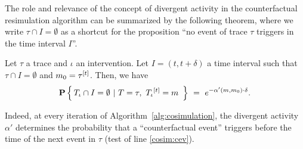 

The role and relevance of the concept of divergent activity in the
counterfactual resimulation algorithm can be summarized by the
following theorem, where we write $\tau \cap I = \emptyset$ as a
shortcut for the proposition ``no event of trace $\tau$ triggers in
the time interval $I$''.
\begin{theorem} Let $\tau$ a trace
  and $\iota$ an intervention. Let $I = (t, t+\delta)$ a time interval
  such that $\tau \cap I = \emptyset$ and $m_0 =
  \tau^{[t]}$. Then, we have
  \[\mathbf{P} \left\{\,  {T_\iota}{} \cap I = \emptyset  \ |\  T=\tau,\
      {T_\iota}{}^{[t]} = m\  \,\right\}
    \ =\ e^{-\alpha'(m, m_0) \cdot \delta}.
  \]
\end{theorem}
\noindent Indeed, at every iteration of
Algorithm~\ref{alg:cosimulation}, the divergent activity $\alpha'$
determines the probability that a ``counterfactual event'' triggers
before the time of the next event in $\tau$ (test of line \ref{cosim:cev}).

%
